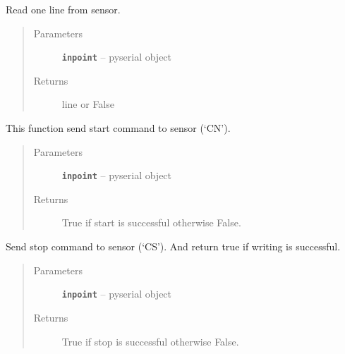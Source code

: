 \documentclass[12pt]{article}
\begin{document}

\begin{fulllineitems}
\label{index:reader.readline}
Read one line from sensor.
\begin{quote}\begin{description}
\item[{Parameters}] \leavevmode
\textbf{\texttt{inpoint}} -- pyserial object

\item[{Returns}] \leavevmode
line or False

\end{description}\end{quote}

\end{fulllineitems}


\begin{fulllineitems}
\label{index:reader.start_sensor}
This function send start command to sensor (`CN').
\begin{quote}\begin{description}
\item[{Parameters}] \leavevmode
\textbf{\texttt{inpoint}} -- pyserial object

\item[{Returns}] \leavevmode
True if start is successful otherwise False.

\end{description}\end{quote}

\end{fulllineitems}


\begin{fulllineitems}
\label{index:reader.stop_sensor}
Send stop command to sensor (`CS'). And return true if writing
is successful.
\begin{quote}\begin{description}
\item[{Parameters}] \leavevmode
\textbf{\texttt{inpoint}} -- pyserial object

\item[{Returns}] \leavevmode
True if stop is successful otherwise False.

\end{description}\end{quote}

\end{fulllineitems}
\end{document}
